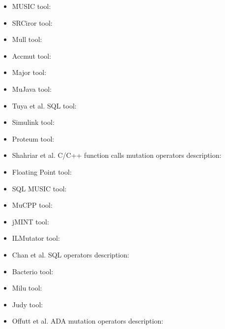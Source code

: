 \begin{itemize}
	\item MUSIC tool: \cite{phan2018music}
	\item SRCiror tool: \cite{hariri2018srciror}
	\item Mull tool: \cite{denisov2018mull}
	\item Accmut tool: \cite{wang2017faster}
	\item Major tool: \cite{just2014major}
	\item MuJava tool: \cite{ma2006mujava}
	\item Tuya et al. SQL tool: \cite{tuya2007mutating}
	\item Simulink tool: \cite{binh2012mutation}
	\item Proteum tool: \cite{delamaro2001interface}
	\item Shahriar et al. C/C++ function calls mutation operators description: \cite{shahriar2008mutation} %
	\item Floating Point tool: \cite{dan2012semantic}
	\item SQL MUSIC tool: \cite{shahriar2008music}
	\item MuCPP tool: \cite{delgado2017assessment}
	\item jMINT tool: \cite{grechanik2016mutation}
	\item ILMutator tool: \cite{derezinska2011object}
	\item Chan et al. SQL operators description: \cite{chan2005fault}
	\item Bacterio tool: \cite{mateo2012validating}
	\item Milu tool: \cite{jia2008milu}
	\item Judy tool: \cite{madeyski2010judy}
	\item Offutt et al. ADA mutation operators description: \cite{rothermel1996experimental} 
\end{itemize}

